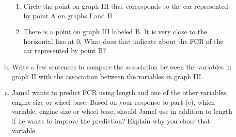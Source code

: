 \documentclass[a4paper,12pt,twoside]{book}
\begin{document}
\begin{enumerate}
\begin{enumerate}[(a), start = 1]
          \begin{enumerate}[(\roman*), start = 1]
           \item  Circle the point on graph III that corresponds to the car represented by point A on graphs I and II.
           \item There is a point on graph III labeled B. It is very close to the horizontal line at 0. What does that indicate about the FCR of the car represented by point B?
          \end{enumerate}
     \vspace{0.5cm}
          
      \item Write a few sentences to compare the association between the variables in graph II with the association between the variables in graph III.\\
      
      \item  Jamal wants to predict FCR using length and one of the other variables, engine size or wheel base. Based on your response to part (c), which variable, engine size or wheel base, should Jamal use in addition to length if he wants to improve the prediction? Explain why you chose that variable.
     \end{enumerate}
     \newpage
     

\end{enumerate}
\end{document}

